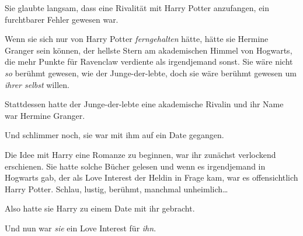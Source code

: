 Sie glaubte langsam, dass eine Rivalität mit Harry Potter anzufangen, ein furchtbarer Fehler gewesen war.

Wenn sie sich nur von Harry Potter \emph{ferngehalten} hätte, hätte sie Hermine Granger sein können, der hellste Stern am akademischen Himmel von Hogwarts, die mehr Punkte für Ravenclaw verdiente als irgendjemand sonst. Sie wäre nicht \emph{so} berühmt gewesen, wie der Junge-der-lebte, doch sie wäre berühmt gewesen um \emph{ihrer selbst} willen.

Stattdessen hatte der Junge-der-lebte eine akademische Rivalin und ihr Name war Hermine Granger.

Und schlimmer noch, sie war mit ihm auf ein Date gegangen.

Die Idee mit Harry eine Romanze zu beginnen, war ihr zunächst verlockend erschienen. Sie hatte solche Bücher gelesen und wenn es irgendjemand in Hogwarts gab, der als Love Interest der Heldin in Frage kam, war es offensichtlich Harry Potter. Schlau, lustig, berühmt, manchmal unheimlich…

Also hatte sie Harry zu einem Date mit ihr gebracht.

Und nun war \emph{sie} ein Love Interest für \emph{ihn}.

